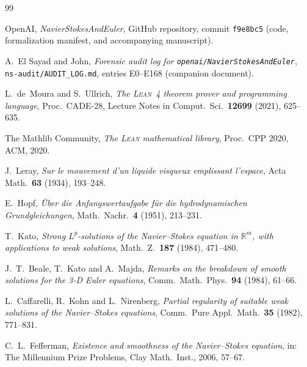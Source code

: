 \documentclass[11pt]{article}
\newcommand{\R}{\mathbb{R}}
\newcommand{\Lean}{\textsc{Lean}}
\newcommand{\file}[1]{\texttt{\small #1}}
\theoremstyle{plain}
\theoremstyle{definition}
\theoremstyle{remark}
\begin{document}
\begin{thebibliography}{99}

OpenAI, \emph{NavierStokesAndEuler}, GitHub repository, commit
\texttt{f9e8bc5} (code, formalization manifest, and accompanying manuscript).

A.~El Sayad and John, \emph{Forensic audit log for
\texttt{openai/NavierStokesAndEuler}}, \file{ns-audit/AUDIT\_LOG.md}, entries
E0--E168 (companion document).

L.~de~Moura and S.~Ullrich, \emph{The \Lean{}~4 theorem prover and programming
language}, Proc.\ CADE-28, Lecture Notes in Comput.\ Sci.\ \textbf{12699}
(2021), 625--635.

The Mathlib Community, \emph{The \Lean{} mathematical library}, Proc.\ CPP
2020, ACM, 2020.

J.~Leray, \emph{Sur le mouvement d'un liquide visqueux emplissant l'espace},
Acta Math.\ \textbf{63} (1934), 193--248.

E.~Hopf, \emph{\"Uber die Anfangswertaufgabe f\"ur die hydrodynamischen
Grundgleichungen}, Math.\ Nachr.\ \textbf{4} (1951), 213--231.

T.~Kato, \emph{Strong $L^p$-solutions of the Navier--Stokes equation in
$\R^m$, with applications to weak solutions}, Math.\ Z.\ \textbf{187} (1984),
471--480.

J.~T.~Beale, T.~Kato and A.~Majda, \emph{Remarks on the breakdown of smooth
solutions for the 3-D Euler equations}, Comm.\ Math.\ Phys.\ \textbf{94}
(1984), 61--66.

L.~Caffarelli, R.~Kohn and L.~Nirenberg, \emph{Partial regularity of suitable
weak solutions of the Navier--Stokes equations}, Comm.\ Pure Appl.\ Math.\
\textbf{35} (1982), 771--831.

C.~L.~Fefferman, \emph{Existence and smoothness of the Navier--Stokes
equation}, in: The Millennium Prize Problems, Clay Math.\ Inst., 2006,
57--67.

\end{thebibliography}
\end{document}
